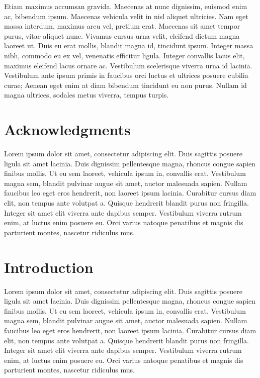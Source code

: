 \documentclass[
  a4paper,
  DIV=11,
  numbers=noendperiod]{scrreprt}
\theoremstyle{definition}
\theoremstyle{remark}
\begin{document}
Etiam maximus accumsan gravida. Maecenas at nunc dignissim, euismod enim
ac, bibendum ipsum. Maecenas vehicula velit in nisl aliquet ultricies.
Nam eget massa interdum, maximus arcu vel, pretium erat. Maecenas sit
amet tempor purus, vitae aliquet nunc. Vivamus cursus urna velit,
eleifend dictum magna laoreet ut. Duis eu erat mollis, blandit magna id,
tincidunt ipsum. Integer massa nibh, commodo eu ex vel, venenatis
efficitur ligula. Integer convallis lacus elit, maximus eleifend lacus
ornare ac. Vestibulum scelerisque viverra urna id lacinia. Vestibulum
ante ipsum primis in faucibus orci luctus et ultrices posuere cubilia
curae; Aenean eget enim at diam bibendum tincidunt eu non purus. Nullam
id magna ultrices, sodales metus viverra, tempus turpis.

\newpage{}


\chapter*{Acknowledgments}\label{acknowledgments}


Lorem ipsum dolor sit amet, consectetur adipiscing elit. Duis sagittis
posuere ligula sit amet lacinia. Duis dignissim pellentesque magna,
rhoncus congue sapien finibus mollis. Ut eu sem laoreet, vehicula ipsum
in, convallis erat. Vestibulum magna sem, blandit pulvinar augue sit
amet, auctor malesuada sapien. Nullam faucibus leo eget eros hendrerit,
non laoreet ipsum lacinia. Curabitur cursus diam elit, non tempus ante
volutpat a. Quisque hendrerit blandit purus non fringilla. Integer sit
amet elit viverra ante dapibus semper. Vestibulum viverra rutrum enim,
at luctus enim posuere eu. Orci varius natoque penatibus et magnis dis
parturient montes, nascetur ridiculus mus.

\newpage{}

\tableofcontents

\newpage{}


\chapter{Introduction}\label{introduction}


Lorem ipsum dolor sit amet, consectetur adipiscing elit. Duis sagittis
posuere ligula sit amet lacinia. Duis dignissim pellentesque magna,
rhoncus congue sapien finibus mollis. Ut eu sem laoreet, vehicula ipsum
in, convallis erat. Vestibulum magna sem, blandit pulvinar augue sit
amet, auctor malesuada sapien. Nullam faucibus leo eget eros hendrerit,
non laoreet ipsum lacinia. Curabitur cursus diam elit, non tempus ante
volutpat a. Quisque hendrerit blandit purus non fringilla. Integer sit
amet elit viverra ante dapibus semper. Vestibulum viverra rutrum enim,
at luctus enim posuere eu. Orci varius natoque penatibus et magnis dis
parturient montes, nascetur ridiculus mus.
\end{document}
